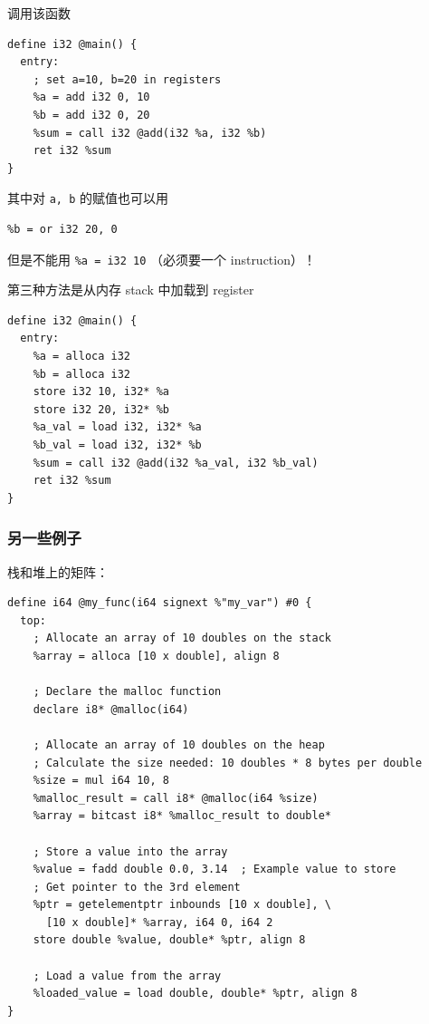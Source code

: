 调用该函数
\begin{lstlisting}[language=none]
define i32 @main() {
  entry:
    ; set a=10, b=20 in registers
    %a = add i32 0, 10
    %b = add i32 0, 20
    %sum = call i32 @add(i32 %a, i32 %b)
    ret i32 %sum
}
\end{lstlisting}

其中对 \verb`a, b` 的赋值也可以用
\begin{lstlisting}[language=none]
%a = or i32 10, 0
%b = or i32 20, 0
\end{lstlisting}
但是不能用 \verb`%a = i32 10` （必须要一个 instruction）！

第三种方法是从内存 stack 中加载到 register
\begin{lstlisting}[language=none]
define i32 @main() {
  entry:
    %a = alloca i32
    %b = alloca i32
    store i32 10, i32* %a
    store i32 20, i32* %b
    %a_val = load i32, i32* %a
    %b_val = load i32, i32* %b
    %sum = call i32 @add(i32 %a_val, i32 %b_val)
    ret i32 %sum
}
\end{lstlisting}

\subsubsection{另一些例子}
栈和堆上的矩阵：
\begin{lstlisting}[language=none]
define i64 @my_func(i64 signext %"my_var") #0 {
  top:
    ; Allocate an array of 10 doubles on the stack
    %array = alloca [10 x double], align 8

    ; Declare the malloc function
    declare i8* @malloc(i64)

    ; Allocate an array of 10 doubles on the heap
    ; Calculate the size needed: 10 doubles * 8 bytes per double
    %size = mul i64 10, 8
    %malloc_result = call i8* @malloc(i64 %size)
    %array = bitcast i8* %malloc_result to double*

    ; Store a value into the array
    %value = fadd double 0.0, 3.14  ; Example value to store
    ; Get pointer to the 3rd element
    %ptr = getelementptr inbounds [10 x double], \
      [10 x double]* %array, i64 0, i64 2
    store double %value, double* %ptr, align 8

    ; Load a value from the array
    %loaded_value = load double, double* %ptr, align 8
}
\end{lstlisting}

